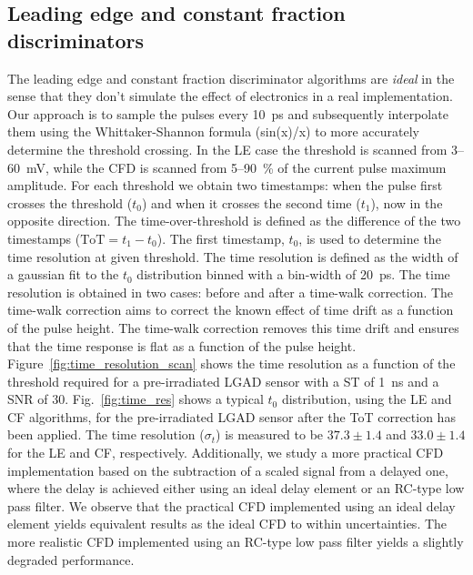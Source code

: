 \documentclass[preprint,1p]{elsarticle}
\begin{document}
\subsection{Leading edge and constant fraction discriminators}\label{sec:le_and_cfd}
The leading edge and constant fraction discriminator algorithms are \textit{ideal} in the sense that they don't simulate the effect of
electronics in a real implementation. Our approach is to sample the pulses every 10~\si{ps} and subsequently interpolate them
using the Whittaker-Shannon formula (sin(x)/x) to more accurately determine the threshold crossing. In the LE case the threshold is scanned
from 3--60~\si{mV}, while the CFD is scanned from 5--90~\% of the current pulse maximum amplitude. For each threshold we obtain two
timestamps: when the pulse first crosses the threshold ($t_{0}$) and when it crosses the second time ($t_{1}$), now in the opposite
direction. The time-over-threshold is defined as the difference of the two timestamps ($\mathrm{ToT} = t_{1} - t_{0}$). The first
timestamp, $t_{0}$, is used to determine the time resolution at given threshold. The time resolution is defined as the width of
a gaussian fit to the $t_{0}$ distribution binned with a bin-width of 20~\si{ps}. The time resolution is obtained in two cases:
before and after a time-walk correction. The time-walk correction aims to correct the known effect of time drift as a function
of the pulse height. The time-walk correction removes this time drift and ensures that the time response is flat as a function
of the pulse height. Figure~\ref{fig:time_resolution_scan} shows the time resolution as a function
of the threshold required for a pre-irradiated LGAD sensor with a ST of 1~\si{ns} and a SNR of 30.
Fig.~\ref{fig:time_res} shows a typical $t_{0}$ distribution, using the LE and CF algorithms, for the pre-irradiated
LGAD sensor after the ToT correction has been applied. The time resolution ($\sigma_{t}$) is measured to be $37.3 \pm 1.4 $
and $33.0 \pm 1.4$ for the LE and CF, respectively. Additionally, we study a more practical CFD implementation
based on the subtraction of a scaled signal from a delayed one, where the delay is achieved either using an ideal 
delay element or an RC-type low pass filter. We observe that the practical CFD implemented using an ideal delay element 
yields equivalent results as the ideal CFD to within uncertainties. The more realistic CFD implemented using 
an RC-type low pass filter yields a slightly degraded performance.
\end{document}
